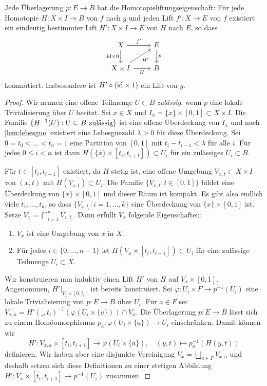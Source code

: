 \begin{theorem}
Jede Überlagerung $p\colon E\to B$ hat die Homotopieliftungseigenschaft: Für jede Homotopie $H\colon X\times I\to B$ von $f$ nach $g$ und jeden Lift $f'\colon X\to E$ von $f$ existiert ein eindeutig bestimmter Lift $H'\colon X\times I\to E$ von $H$ nach $E$, so dass
\[
\begin{tikzcd}
X \ar[r, "{f'}"] \ar[d, "{\id}\times 0"'] & E \ar[d, "p"] \\
X\times I \ar[r, "H"'] \ar[ru, "{H'}"'] & B
\end{tikzcd}
\]
kommutiert. Insbesondere ist $H'\circ ({\operatorname{\textnormal{id}}}\times 1)$ ein Lift von $g$.
\end{theorem}
\begin{proof}
Wir nennen eine offene Teilmenge $U\subset B$ \emph{zulässig}, wenn $p$ eine lokale Trivialisierung über $U$ besitzt. Sei $x\in X$ und $I_x = \{x\}\times [0,1]\subset X\times I$. Die Familie $\{H^{-1}(U) : \textnormal{$U\subset B$ zulässig}\}$ ist eine offene Überdeckung von $I_x$ und nach \autoref{lem:lebesgue} existiert eine Lebesguezahl $\lambda > 0$ für diese Überdeckung. Sei $0 = t_0 < \dots < t_n = 1$ eine Partition von $[0,1]$ mit $t_i - t_{i-1} < \lambda$ für alle $i$. Für jedes $0\leq i < n$ ist dann $H(\{x\}\times[t_i,t_{i+1}])\subset U_i$ für ein zulässiges $U_i\subset B$.

Für $t\in [t_i,t_{i+1}]$ existiert, da $H$ stetig ist, eine offene Umgebung $V_{x,t}\subset X\times I$ von $(x,t)$ mit $H(V_{x,t})\subset U_i$. Die Familie $\{V_{x,t} : t\in [0,1]\}$ bildet eine Überdeckung von $\{x\}\times [0,1]$ und dieser Raum ist kompakt. Es gibt also endlich viele $t_1,\dots,t_k$, so dass $\{V_{x,t_i} : i=1,\dots, k\}$ eine Überdeckung von $\{x\}\times [0,1]$ ist. Setze $V_x = \bigcap_{i=1}^n V_{x,t_i}$. Dann erfüllt $V_x$ folgende Eigenschaften:
\begin{enumerate}
\item $V_x$ ist eine Umgebung von $x$ in $X$.
\item Für jedes $i\in\{0,\dots,n-1\}$ ist $H(V_x\times [t_i,t_{i+1}])\subset U_i$ für eine zulässige Teilmenge $U_i\subset X$.
\end{enumerate}

Wir konstruieren nun induktiv einen Lift $H'$ von $H$ auf $V_x\times[0,1]$. Angenommen, $H'|_{V_x\times[0,t_i]}$ ist bereits konstruiert. Sei $\varphi\colon U_i\times F \to p^{-1}(U_i)$ eine lokale Trivialisierung von $p\colon E\to B$ über $U_i$. Für $a\in F$ sei $V_{x,a} = H'(\_,t_i)^{-1}(\varphi(U_i\times\{a\}))\cap V_x$. Die Überlagerung $p\colon E\to B$ lässt sich zu einem Homöomorphismus $p_a\colon \varphi(U_i\times\{a\})\to U_i$ einschränken. Damit können wir
\[
H'\colon V_{x,a}\times [t_i,t_{i+1}] \to \varphi(U_i\times\{a\}),\quad (y,t)\mapsto p_a^{-1}(H(y,t))
\]
definieren. Wir haben aber eine disjunkte Vereinigung $V_x = \bigsqcup_{a\in F} V_{x,a}$ und deshalb setzen sich diese Definitionen zu einer stetigen Abbildung $H'\colon V_x\times [t_i,t_{i+1}]\to p^{-1}(U_i)$ zusammen.


\end{proof}
